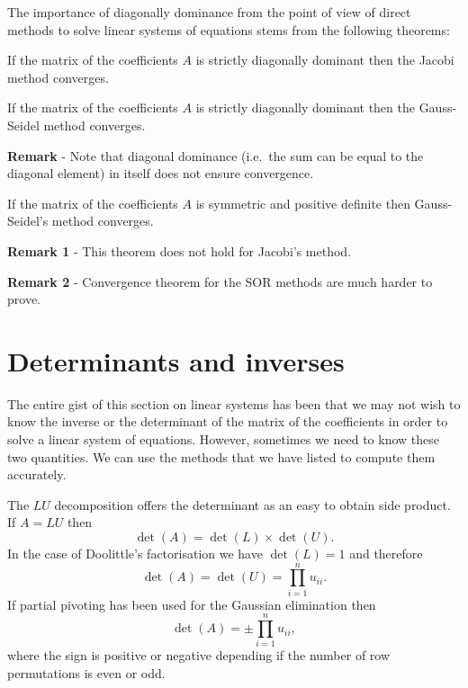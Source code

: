 The importance of diagonally dominance from the point of view of
direct methods to solve linear systems of equations stems from the
following theorems:

\begin{theorem}
If the matrix of the coefficients $A$ is strictly diagonally dominant
then the Jacobi method converges.
\end{theorem}

\medskip

\begin{theorem}
If the matrix of the coefficients $A$ is strictly
diagonally dominant then the Gauss-Seidel method converges.
\end{theorem}

\noindent
\textbf{Remark} - Note that diagonal dominance (i.e.\ the sum can be
equal to the diagonal element) in itself does not ensure convergence.

\smallskip

\begin{theorem}
If the matrix of the coefficients $A$ is
symmetric and positive definite then Gauss-Seidel's method converges.
\end{theorem}

\noindent
\textbf{Remark 1} - This theorem does not hold for Jacobi's method.

\noindent
\textbf{Remark 2} - Convergence theorem for the SOR methods are much
harder to prove.

\section{Determinants and inverses}

The entire gist of this section on linear systems has been that we may
not wish to know the inverse or the determinant of the matrix of the
coefficients in order to solve a linear system of equations.
However, sometimes we need to know these two quantities.  We can use
the methods that we have listed to compute them accurately.

The $LU$ decomposition offers the determinant as an easy to obtain side
product.  If $A = L U$ then
%
\begin{equation*}
  \det(A) = \det(L) \times \det(U).
\end{equation*}
%
In the case of Doolittle's factorisation we have $\det(L) = 1$ and
therefore
%
\begin{equation*}
\det(A) = \det(U) = \prod_{i=1}^n u_{i i} .
\end{equation*}
%
If partial pivoting has been used for the Gaussian elimination then
%
\begin{equation*}
  \det(A) = \pm \prod_{i=1}^n u_{i i} ,
\end{equation*}
%
where the sign is positive or negative depending if the number of row
permutations is even or odd.

